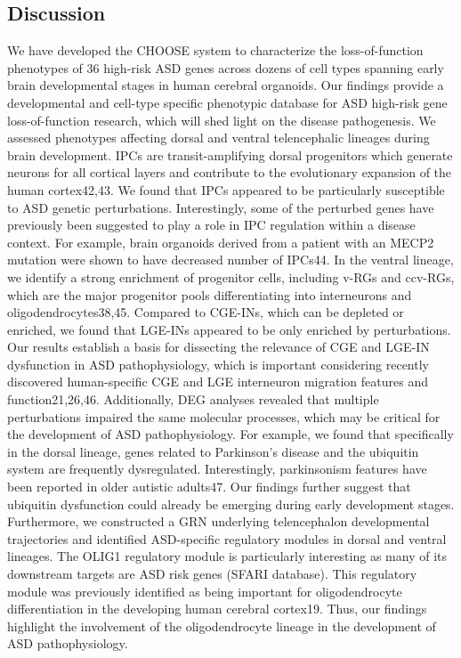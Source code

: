 \subsection{Discussion}
We have developed the CHOOSE system to characterize the loss-of-function phenotypes of 36 high-risk ASD genes across dozens of cell types spanning early brain developmental stages in human cerebral organoids. Our findings provide a developmental and cell-type specific phenotypic database for ASD high-risk gene loss-of-function research, which will shed light on the disease pathogenesis.
We assessed phenotypes affecting dorsal and ventral telencephalic lineages during brain development. IPCs are transit-amplifying dorsal progenitors which generate neurons for all cortical layers and contribute to the evolutionary expansion of the human cortex42,43. We found that IPCs appeared to be particularly susceptible to ASD genetic perturbations. Interestingly, some of the perturbed genes have previously been suggested to play a role in IPC regulation within a disease context. For example, brain organoids derived from a patient with an MECP2 mutation were shown to have decreased number of IPCs44. 
In the ventral lineage, we identify a strong enrichment of progenitor cells, including v-RGs and ccv-RGs, which are the major progenitor pools differentiating into interneurons and oligodendrocytes38,45. Compared to CGE-INs, which can be depleted or enriched, we found that LGE-INs appeared to be only enriched by perturbations. Our results establish a basis for dissecting the relevance of CGE and LGE-IN dysfunction in ASD pathophysiology, which is important considering recently discovered human-specific CGE and LGE interneuron migration features and function21,26,46.
Additionally, DEG analyses revealed that multiple perturbations impaired the same molecular processes, which may be critical for the development of ASD pathophysiology. For example, we found that specifically in the dorsal lineage, genes related to Parkinson's disease and the ubiquitin system are frequently dysregulated. Interestingly, parkinsonism features have been reported in older autistic adults47. Our findings further suggest that ubiquitin dysfunction could already be emerging during early development stages. Furthermore, we constructed a GRN underlying telencephalon developmental trajectories and identified ASD-specific regulatory modules in dorsal and ventral lineages. The OLIG1 regulatory module is particularly interesting as many of its downstream targets are ASD risk genes (SFARI database). This regulatory module was previously identified as being important for oligodendrocyte differentiation in the developing human cerebral cortex19. Thus, our findings highlight the involvement of the oligodendrocyte lineage in the development of ASD pathophysiology.
